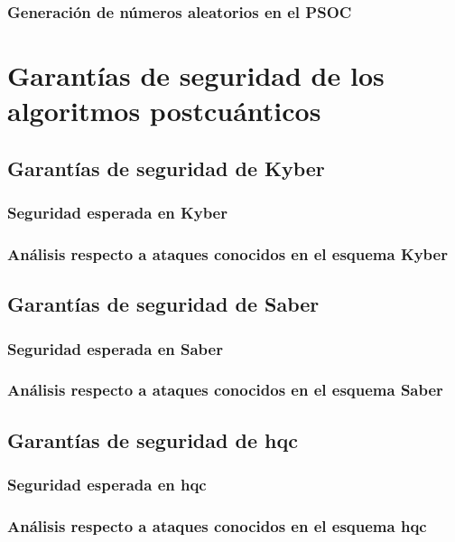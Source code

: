 \subsubsection{Generación de números aleatorios en el PSOC}
\section{Garantías de seguridad de los algoritmos postcuánticos}
\subsection{Garantías de seguridad de Kyber}
\subsubsection{Seguridad esperada en Kyber}
\subsubsection{Análisis respecto a ataques conocidos en el esquema Kyber}
\subsection{Garantías de seguridad de Saber}
\subsubsection{Seguridad esperada en Saber}
\subsubsection{Análisis respecto a ataques conocidos en el esquema Saber}
\subsection{Garantías de seguridad de \gls{hqc}}
\subsubsection{Seguridad esperada en \gls{hqc}}
\subsubsection{Análisis respecto a ataques conocidos en el esquema \gls{hqc}}